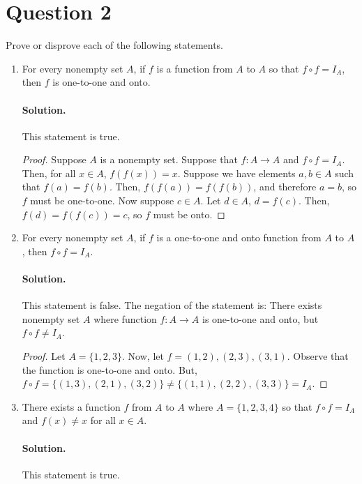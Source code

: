 \documentclass[12pt]{article}
\begin{document}
\section*{Question 2}
Prove or disprove each of the following statements.
\begin{enumerate}[label=\textbf{\alph*.}]

\item For every nonempty set $A$, if $f$ is a function from $A$ to $A$ so that $f \circ f = I_A$, then $f$ is one-to-one and onto.
\paragraph*{Solution.} This statement is true.

\begin{proof}
    Suppose $A$ is a nonempty set. Suppose that $f : A \rightarrow A$ and $f \circ f = I_A$. Then, for all $x \in A$, $f(f(x)) = x$. Suppose we have elements $a, b \in A$ such that $f(a) = f(b)$. Then, $f(f(a)) = f(f(b))$, and therefore $a = b$, so $f$ must be one-to-one. Now suppose $c \in A$. Let $d \in A$, $d = f(c)$. Then, $f(d) = f(f(c)) = c$, so $f$ must be onto.
\end{proof}

\item For every nonempty set $A$, if $f$ is a one-to-one and onto function from $A$ to $A$, then $f \circ f = I_A$.
\paragraph*{Solution.} This statement is false. The negation of the statement is: There exists nonempty set $A$ where function $f : A \rightarrow A$ is one-to-one and onto, but $f \circ f \neq I_A$.

\begin{proof}
    Let $A = \{1, 2, 3\}$. Now, let $f = {(1, 2), (2, 3), (3, 1)}$. Observe that the function is one-to-one and onto. But, $f \circ f = \{(1, 3), (2, 1), (3, 2)\} \neq \{(1, 1), (2, 2), (3, 3)\} = I_A$.
\end{proof}


\item There exists a function $f$ from $A$ to $A$ where $A = \{1, 2, 3, 4\}$ so that $f \circ f = I_A$ and $f(x) \neq x$ for all $x \in A$.
\paragraph*{Solution.} This statement is true. 


\end{enumerate}
\end{document}
